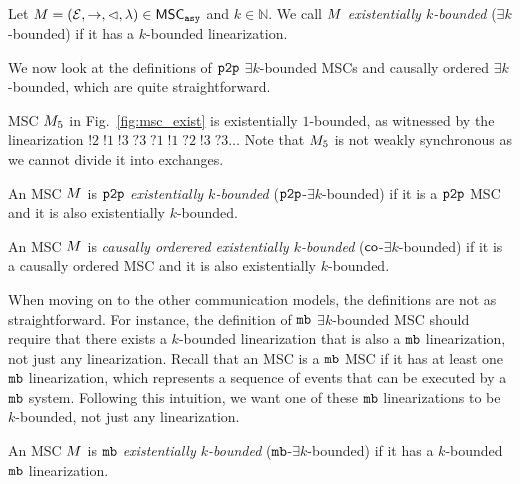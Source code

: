 \begin{definition}\label{def:ek_bounded_msc}
	Let $M = (\mathcal{E}, \rightarrow, \lhd, \lambda) \in \mathsf{MSC}_{\mathtt{asy}}$ and $k \in \mathbb{N}$. We call $M$ \emph{existentially $k$-bounded} ($\exists k$-bounded) if it has a $k$-bounded linearization.
\end{definition}
We now look at the definitions of $\mathtt{p2p}$ $\exists k$-bounded MSCs and causally ordered $\exists k$-bounded, which are quite straightforward.

\begin{example}
MSC $M_{5}$ in Fig.~\ref{fig:msc_exist}
is existentially $1$-bounded, as witnessed by the linearization $!2\;!1\;!3\;?3\;?1\;!1\;?2\;!3\;?3 \ldots$
Note that $M_{5}$ is not weakly synchronous as we cannot divide it into exchanges.
\end{example}

\begin{definition}
	An MSC $M$ is \emph{$\mathtt{p2p}$ existentially $k$-bounded} ($\mathtt{p2p}$-$\exists k$-bounded) if it is a $\mathtt{p2p}$ MSC and it is also existentially $k$-bounded.
\end{definition}
\begin{definition}
	An MSC $M$ is \emph{causally orderered existentially $k$-bounded} ($\mathsf{co}$-$\exists k$-bounded) if it is a causally ordered MSC and it is also existentially $k$-bounded.
\end{definition}

When moving on to the other communication models, the definitions are not as straightforward. For instance, the definition of $\mathtt{mb}$ $\exists k$-bounded MSC should require that there exists a $k$-bounded linearization that is also a $\mathtt{mb}$ linearization, not just any linearization. Recall that an MSC is a $\mathtt{mb}$ MSC if it has at least one $\mathtt{mb}$ linearization, which represents a sequence of events that can be executed by a $\mathtt{mb}$ system. Following this intuition, we want one of these $\mathtt{mb}$ linearizations to be $k$-bounded, not just any linearization.

\begin{definition}
	An MSC $M$ is \emph{$\mathtt{mb}$ existentially $k$-bounded} ($\mathtt{mb}$-$\exists k$-bounded) if it has a $k$-bounded $\mathtt{mb}$ linearization.
\end{definition}

